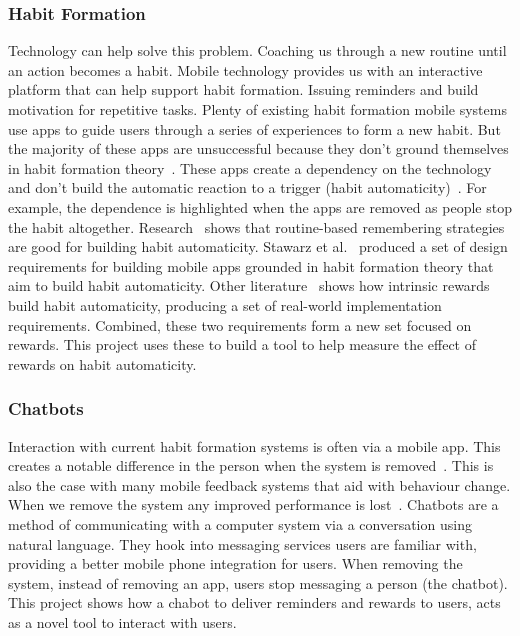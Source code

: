 \subsubsection*{Habit Formation}
Technology can help solve this problem. Coaching us through a new routine until an action becomes a habit.
Mobile technology provides us with an interactive platform that can help support habit formation. Issuing reminders and build motivation for repetitive tasks.
Plenty of existing habit formation mobile systems use apps to guide users through a series of experiences to form a new habit.
But the majority of these apps are unsuccessful because they don't ground themselves in habit formation theory~\cite{article_beyond_self_tracking_designing_apps, article_apps_of_steel}.
These apps create a dependency on the technology and don't build the automatic reaction to a trigger (habit automaticity)~\cite{article_dont_kick_habit}.
For example, the dependence is highlighted when the apps are removed as people stop the habit altogether.\newline
\newline
Research~\cite{article_understanding_use_contextual_cues_design_impl} shows that routine-based remembering strategies are good for building habit automaticity.
Stawarz et al.~\cite{article_dont_forget_your_pill} produced a set of design requirements for building mobile apps grounded in habit formation theory that aim to build habit automaticity.
Other literature~\cite{article_taxonomy_motivational_affordances_meaningful} shows how intrinsic rewards build habit automaticity, producing a set of real-world implementation requirements.
Combined, these two requirements form a new set focused on rewards. This project uses these to build a tool to help measure the effect of rewards on habit automaticity.

\subsubsection*{Chatbots}
Interaction with current habit formation systems is often via a mobile app. This creates a notable difference in the person when the system is removed~\cite{article_my_phone_is_part_of_my_soul}.
This is also the case with many mobile feedback systems that aid with behaviour change.
When we remove the system any improved performance is lost~\cite{article_dont_kick_habit, article_realtime_feedback_improving_medication_taking}.\newline
\newline
Chatbots are a method of communicating with a computer system via a conversation using natural language.
They hook into messaging services users are familiar with, providing a better mobile phone integration for users.
When removing the system, instead of removing an app, users stop messaging a person (the chatbot).
This project shows how a chabot to deliver reminders and rewards to users, acts as a novel tool to interact with users.

